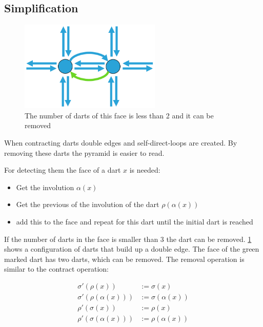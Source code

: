 \documentclass[12pt]{article}
\begin{document}

\subsection{Simplification}%
\label{sub:simplification}

\begin{figure}[tb]
  \centering
  \includegraphics[width=0.6\textwidth]{img/face.pdf}
  \caption{The number of darts of this face is less than 2 and it can be removed}%
  \label{fig:faces}
\end{figure}

When contracting darts double edges and self-direct-loops are created. By removing these darts the pyramid is easier to read.

For detecting them the face of a dart \(x\) is needed:

\begin{itemize}
  \item Get the involution \(\alpha(x)\)
  \item Get the previous of the involution of the dart \(\rho(\alpha(x))\)
  \item add this to the face and repeat for this dart until the initial dart is reached
\end{itemize}

If the number of darts in the face is smaller than 3 the dart can be removed.
\cref{fig:faces} shows a configuration of darts that build up a double edge. The face of the green marked dart has two darts, which can be removed.
The removal operation is similar to the contract operation:

\begin{align}
  \sigma'(\rho(x))   &:= \sigma(x)                \\
  \sigma'(\rho(\alpha(x)))  &:= \sigma(\alpha(x)) \\
  \rho'(\sigma(x))   &:= \rho(x)                  \\
  \rho'(\sigma(\alpha(x)))  &:= \rho(\alpha(x))
\end{align}
\end{document}
